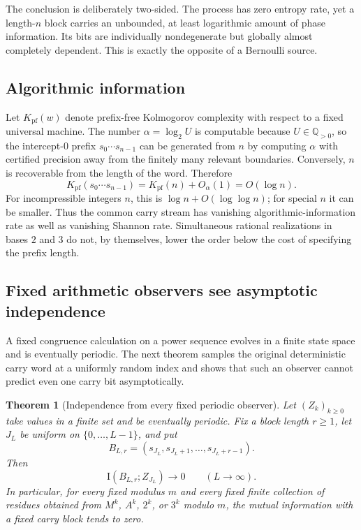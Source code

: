 \documentclass[11pt,oneside]{article}
\newtheorem{theorem}{Theorem}[section]
\theoremstyle{definition}
\theoremstyle{remark}
\newcommand{\Q}{\mathbb{Q}}
\newcommand{\II}{\mathrm{I}}
\begin{document}
The conclusion is deliberately two-sided.  The process has zero entropy rate, yet a length-$n$ block carries an unbounded, at least logarithmic amount of phase information.  Its bits are individually nondegenerate but globally almost completely dependent.  This is exactly the opposite of a Bernoulli source.

\subsection{Algorithmic information}

Let $K_{\mathrm{pf}}(w)$ denote prefix-free Kolmogorov complexity with respect to a fixed universal machine.  The number $\alpha=\log_2U$ is computable because $U\in\Q_{>0}$, so the intercept-$0$ prefix $s_0\cdots s_{n-1}$ can be generated from $n$ by computing $\alpha$ with certified precision away from the finitely many relevant boundaries.  Conversely, $n$ is recoverable from the length of the word.  Therefore
\begin{equation}\label{eq:kolmogorov}
 K_{\mathrm{pf}}(s_0\cdots s_{n-1})=K_{\mathrm{pf}}(n)+O_{\alpha}(1)=O(\log n).
\end{equation}
For incompressible integers $n$, this is $\log n+O(\log\log n)$; for special $n$ it can be smaller.  Thus the common carry stream has vanishing algorithmic-information rate as well as vanishing Shannon rate.  Simultaneous rational realizations in bases $2$ and $3$ do not, by themselves, lower the order below the cost of specifying the prefix length.

\subsection{Fixed arithmetic observers see asymptotic independence}

A fixed congruence calculation on a power sequence evolves in a finite state space and is eventually periodic.  The next theorem samples the original deterministic carry word at a uniformly random index and shows that such an observer cannot predict even one carry bit asymptotically.

\begin{theorem}[Independence from every fixed periodic observer]\label{thm:periodic-observer}
Let $(Z_k)_{k\geq0}$ take values in a finite set and be eventually periodic.  Fix a block length $r\geq1$, let $J_L$ be uniform on $\{0,\ldots,L-1\}$, and put
\[
 B_{L,r}=(s_{J_L},s_{J_L+1},\ldots,s_{J_L+r-1}).
\]
Then
\begin{equation}\label{eq:periodic-independence}
 \II(B_{L,r};Z_{J_L})\longrightarrow0
 \qquad(L\to\infty).
\end{equation}
In particular, for every fixed modulus $m$ and every fixed finite collection of residues obtained from $M^k$, $A^k$, $2^k$, or $3^k$ modulo $m$, the mutual information with a fixed carry block tends to zero.
\end{theorem}
\end{document}
